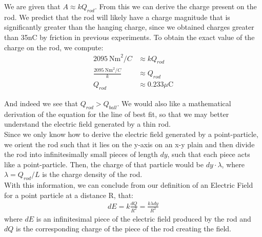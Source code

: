 \documentclass[oneside,12pt]{amsart}
\begin{document}
	\indent We are given that $A\approx kQ_{rod}$. From this we can derive the charge present on the rod. We predict that the rod will likely have a charge magnitude that is significantly greater than the hanging charge, since we obtained charges greater than 35nC by friction in previous experiments. To obtain the exact value of the charge on the rod, we compute:
	\begin{align*}
	2095\:\text{Nm}^2/C &\approx kQ_{rod}\\
	\frac{2095\:\text{Nm}^2/C}{k}&\approx Q_{rod}\\
	Q_{rod}&\approx 0.233\mu\text{C}
	\end{align*}
	
	\indent And indeed we see that $Q_{rod}>Q_{ball}$. We would also like a mathematical derivation of the equation for the line of best fit, so that we may better understand the electric field generated by a thin rod.\\
	
	\indent Since we only know how to derive the electric field generated by a point-particle, we orient the rod such that it lies on the y-axis on an x-y plain and then divide the rod into infinitesimally small pieces of length $dy$, such that each piece acts like a point-particle. Then, the charge of that particle would be $dy\cdot \lambda$, where $\lambda = Q_{rod}/L$ is the charge density of the rod.\\
	
	\indent With this information, we can conclude from our definition of an Electric Field for a point particle at a distance R, that: 
	\begin{align*}
	 dE = k\frac{dQ}{R^2} = \frac{k\lambda dy}{R^2}
	\end{align*}
	where $dE$ is an infinitesimal piece of the electric field produced by the rod and $dQ$ is the corresponding charge of the piece of the rod creating the field.\\
	
\end{document}
